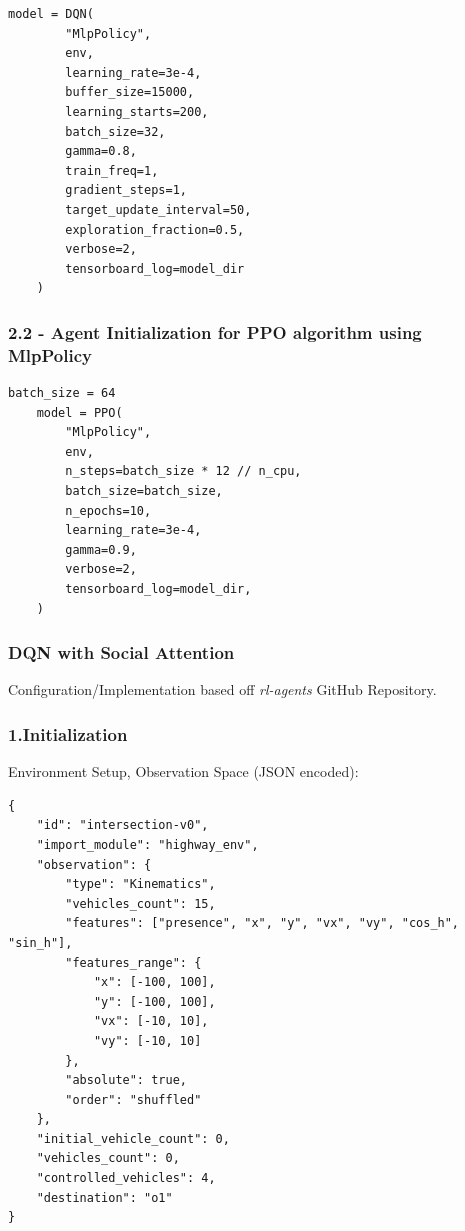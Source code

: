  \begin{lstlisting}[style=python]
    model = DQN(
        "MlpPolicy",
        env,
        learning_rate=3e-4,
        buffer_size=15000,
        learning_starts=200,
        batch_size=32,
        gamma=0.8,
        train_freq=1,
        gradient_steps=1,
        target_update_interval=50,
        exploration_fraction=0.5,
        verbose=2,
        tensorboard_log=model_dir
    )
\end{lstlisting}

\subsubsection{2.2 - Agent Initialization for PPO algorithm using MlpPolicy}

\begin{lstlisting}[style=python]
    batch_size = 64
    model = PPO(
        "MlpPolicy",
        env,
        n_steps=batch_size * 12 // n_cpu,
        batch_size=batch_size,
        n_epochs=10,
        learning_rate=3e-4,
        gamma=0.9,
        verbose=2,
        tensorboard_log=model_dir,
    )
\end{lstlisting}

\subsubsection{DQN with Social Attention}

Configuration/Implementation based off \textit{rl-agents} GitHub Repository\cite{rl-agents}.
\subsubsection{1.Initialization}

Environment Setup, Observation Space (JSON encoded): 

\begin{lstlisting}[style=json]
{
    "id": "intersection-v0",
    "import_module": "highway_env",
    "observation": {
        "type": "Kinematics",
        "vehicles_count": 15,
        "features": ["presence", "x", "y", "vx", "vy", "cos_h", "sin_h"],
        "features_range": {
            "x": [-100, 100],
            "y": [-100, 100],
            "vx": [-10, 10],
            "vy": [-10, 10]
        },
        "absolute": true,
        "order": "shuffled"
    },
    "initial_vehicle_count": 0,
    "vehicles_count": 0,
    "controlled_vehicles": 4,
    "destination": "o1"
}

\end{lstlisting}

